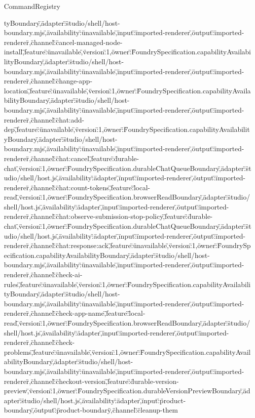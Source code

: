 \begin{lexlean}{CommandRegistry}
\begin{semanticmodule}
{tyBoundary\",\"adapter\":\"studio/shell/host-boundary.mjs\",\"availability\":\"unavailable\",\"input\":\"imported-renderer\",\"output\":\"imported-renderer\"},{\"channel\":\"cancel-managed-node-install\",\"feature\":\"unavailable\",\"version\":1,\"owner\":\"FoundrySpecification.capabilityAvailabilityBoundary\",\"adapter\":\"studio/shell/host-boundary.mjs\",\"availability\":\"unavailable\",\"input\":\"imported-renderer\",\"output\":\"imported-renderer\"},{\"channel\":\"change-app-location\",\"feature\":\"unavailable\",\"version\":1,\"owner\":\"FoundrySpecification.capabilityAvailabilityBoundary\",\"adapter\":\"studio/shell/host-boundary.mjs\",\"availability\":\"unavailable\",\"input\":\"imported-renderer\",\"output\":\"imported-renderer\"},{\"channel\":\"chat:add-dep\",\"feature\":\"unavailable\",\"version\":1,\"owner\":\"FoundrySpecification.capabilityAvailabilityBoundary\",\"adapter\":\"studio/shell/host-boundary.mjs\",\"availability\":\"unavailable\",\"input\":\"imported-renderer\",\"output\":\"imported-renderer\"},{\"channel\":\"chat:cancel\",\"feature\":\"durable-chat\",\"version\":1,\"owner\":\"FoundrySpecification.durableChatQueueBoundary\",\"adapter\":\"studio/shell/host.js\",\"availability\":\"adapter\",\"input\":\"imported-renderer\",\"output\":\"imported-renderer\"},{\"channel\":\"chat:count-tokens\",\"feature\":\"local-read\",\"version\":1,\"owner\":\"FoundrySpecification.browserReadBoundary\",\"adapter\":\"studio/shell/host.js\",\"availability\":\"adapter\",\"input\":\"imported-renderer\",\"output\":\"imported-renderer\"},{\"channel\":\"chat:observe-submission-stop-policy\",\"feature\":\"durable-chat\",\"version\":1,\"owner\":\"FoundrySpecification.durableChatQueueBoundary\",\"adapter\":\"studio/shell/host.js\",\"availability\":\"adapter\",\"input\":\"imported-renderer\",\"output\":\"imported-renderer\"},{\"channel\":\"chat:response:ack\",\"feature\":\"unavailable\",\"version\":1,\"owner\":\"FoundrySpecification.capabilityAvailabilityBoundary\",\"adapter\":\"studio/shell/host-boundary.mjs\",\"availability\":\"unavailable\",\"input\":\"imported-renderer\",\"output\":\"imported-renderer\"},{\"channel\":\"check-ai-rules\",\"feature\":\"unavailable\",\"version\":1,\"owner\":\"FoundrySpecification.capabilityAvailabilityBoundary\",\"adapter\":\"studio/shell/host-boundary.mjs\",\"availability\":\"unavailable\",\"input\":\"imported-renderer\",\"output\":\"imported-renderer\"},{\"channel\":\"check-app-name\",\"feature\":\"local-read\",\"version\":1,\"owner\":\"FoundrySpecification.browserReadBoundary\",\"adapter\":\"studio/shell/host.js\",\"availability\":\"adapter\",\"input\":\"imported-renderer\",\"output\":\"imported-renderer\"},{\"channel\":\"check-problems\",\"feature\":\"unavailable\",\"version\":1,\"owner\":\"FoundrySpecification.capabilityAvailabilityBoundary\",\"adapter\":\"studio/shell/host-boundary.mjs\",\"availability\":\"unavailable\",\"input\":\"imported-renderer\",\"output\":\"imported-renderer\"},{\"channel\":\"checkout-version\",\"feature\":\"durable-version-preview\",\"version\":1,\"owner\":\"FoundrySpecification.durableVersionPreviewBoundary\",\"adapter\":\"studio/shell/host.js\",\"availability\":\"adapter\",\"input\":\"product-boundary\",\"output\":\"product-boundary\"},{\"channel\":\"cleanup-them}
\end{semanticmodule}
\end{lexlean}
